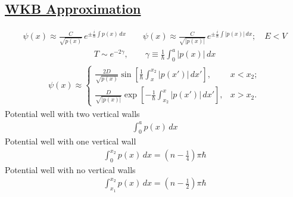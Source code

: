 \newpage
\subsection*{\underline{WKB Approximation}}

\begin{align}
	\psi(x) \approx \frac{C}{\sqrt{p(x)}} \, e^{\pm \frac{i}{\hbar} \int p(x)\, dx}
	\qquad \psi(x) \approx \frac{C}{\sqrt{|p(x)|}} \, e^{\pm \frac{i}{\hbar} \int |p(x)|\, dx}; \quad E < V
\end{align}
\begin{align}
	T \sim e^{-2 \gamma}, \qquad \gamma \equiv \frac{1}{\hbar} \int_0^a |p(x)|\, dx
\end{align}
\begin{align}
	\psi(x) \approx \begin{cases}
		\frac{2D}{\sqrt{p(x)}} \sin{\left[ \frac{1}{\hbar} \int_{x}^{x_2} |p(x')|\, dx' \right]}, & x<x_2 ; \\
		\frac{D}{\sqrt{|p(x)|}} \exp{\left[- \frac{1}{\hbar} \int_{x_2}^x |p(x')|\, dx' \right]}, & x>x_2.
	\end{cases}
\end{align}
Potential well with two vertical walls
\begin{align}
	\int_0^a p(x) \, dx
\end{align}
Potential well with one vertical wall
\begin{align}
	\int_0^{x_2} p(x)\, dx = \left(n - \frac{1}{4} \right) \pi \hbar
\end{align}
Potential well with no vertical walls
\begin{align}
	\int_{x_1}^{x_2} p(x) \, dx = \left( n - \frac{1}{2} \right) \pi \hbar
\end{align}
